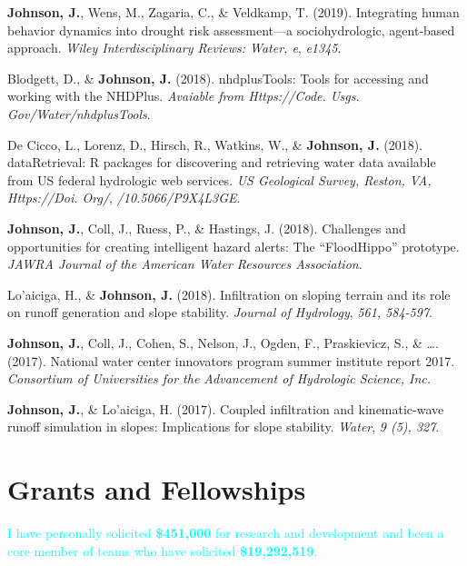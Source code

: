\documentclass[11pt,a4paper,]{awesome-cv}
\begin{document}
\leavevmode{}%
\textbf{Johnson, J.}, Wens, M., Zagaria, C., \& Veldkamp, T. (2019).
Integrating human behavior dynamics into drought risk assessment---a
sociohydrologic, agent‐based approach. \emph{Wiley Interdisciplinary
Reviews: Water, e}, \emph{e1345}.

\leavevmode{}%
Blodgett, D., \& \textbf{Johnson, J.} (2018). nhdplusTools: Tools for
accessing and working with the NHDPlus. \emph{Avaiable from
Https://Code. Usgs. Gov/Water/nhdplusTools}.

\leavevmode{}%
De Cicco, L., Lorenz, D., Hirsch, R., Watkins, W., \&
\textbf{Johnson, J.} (2018). dataRetrieval: R packages for discovering
and retrieving water data available from US federal hydrologic web
services. \emph{US Geological Survey, Reston, VA, Https://Doi. Org/},
\emph{/10.5066/P9X4L3GE}.

\leavevmode{}%
\textbf{Johnson, J.}, Coll, J., Ruess, P., \& Hastings, J. (2018).
Challenges and opportunities for creating intelligent hazard alerts: The
{``FloodHippo''} prototype. \emph{JAWRA Journal of the American Water
Resources Association}.

\leavevmode{}%
Lo'aiciga, H., \& \textbf{Johnson, J.} (2018). Infiltration on sloping
terrain and its role on runoff generation and slope stability.
\emph{Journal of Hydrology}, \emph{561, 584-597}.

\leavevmode{}%
\textbf{Johnson, J.}, Coll, J., Cohen, S., Nelson, J., Ogden, F.,
Praskievicz, S., \& \ldots. (2017). National water center innovators
program summer institute report 2017. \emph{Consortium of Universities
for the Advancement of Hydrologic Science, Inc.}

\leavevmode{}%
\textbf{Johnson, J.}, \& Lo'aiciga, H. (2017). Coupled infiltration and
kinematic-wave runoff simulation in slopes: Implications for slope
stability. \emph{Water}, \emph{9 (5), 327}.

\newpage

\hypertarget{grants-and-fellowships}{%
\section{Grants and Fellowships}\label{grants-and-fellowships}}

\textcolor{cyan}{I have personally solicited \textbf{\$451,000} for research and development and been a core member of teams who have solicited \textbf{\$19,292,519}.}
\end{document}

